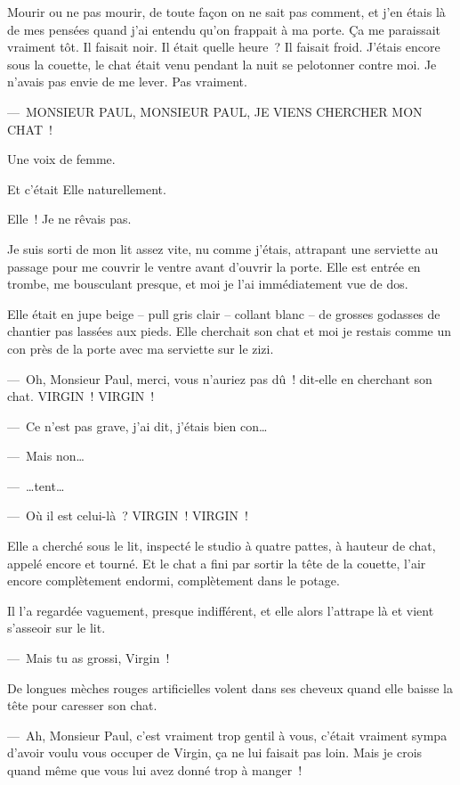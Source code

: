 \documentclass[twoside]{book} %
\begin{document}
\noindent Mourir ou ne pas mourir, de toute façon on ne sait pas comment, et j’en étais là de mes pensées quand j’ai entendu qu’on frappait à ma porte. Ça me paraissait vraiment tôt. Il faisait noir. Il était quelle heure ? Il faisait froid. J’étais encore sous la couette, le chat était venu pendant la nuit se pelotonner contre moi. Je n’avais pas envie de me lever. Pas vraiment.\par
— MONSIEUR PAUL, MONSIEUR PAUL, JE VIENS CHERCHER MON CHAT !\par
Une voix de femme.\par
Et c’était Elle naturellement.\par
Elle ! Je ne rêvais pas.\par
Je suis sorti de mon lit assez vite, nu comme j’étais, attrapant une serviette au passage pour me couvrir le ventre avant d’ouvrir la porte. Elle est entrée en trombe, me bousculant presque, et moi je l’ai immédiatement vue de dos.\par
Elle était en jupe beige – pull gris clair – collant blanc – de grosses godasses de chantier pas lassées aux pieds. Elle cherchait son chat et moi je restais comme un con près de la porte avec ma serviette sur le zizi.\par
— Oh, Monsieur Paul, merci, vous n’auriez pas dû ! dit-elle en cherchant son chat. VIRGIN ! VIRGIN !\par
— Ce n’est pas grave, j’ai dit, j’étais bien con…\par
— Mais non…\par
— …tent…\par
— Où il est celui-là ? VIRGIN ! VIRGIN !\par
Elle a cherché sous le lit, inspecté le studio à quatre pattes, à hauteur de chat, appelé encore et tourné. Et le chat a fini par sortir la tête de la couette, l’air encore complètement endormi, complètement dans le potage.\par
Il l’a regardée vaguement, presque indifférent, et elle alors l’attrape là et vient s’asseoir sur le lit.\par
— Mais tu as grossi, Virgin !\par
De longues mèches rouges artificielles volent dans ses cheveux quand elle baisse la tête pour caresser son chat.\par
— Ah, Monsieur Paul, c’est vraiment trop gentil à vous, c’était vraiment sympa d’avoir voulu vous occuper de Virgin, ça ne lui faisait pas loin. Mais je crois quand même que vous lui avez donné trop à manger !\par
\end{document}
